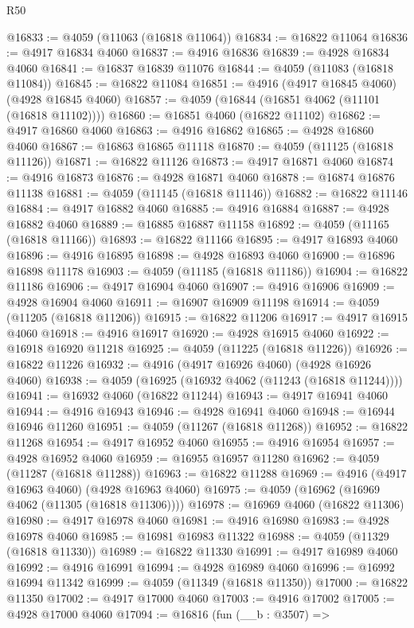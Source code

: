 \begin{lexlean}{R50}
\begin{coremodule}
@16833 := @4059 (@11063 (@16818 @11064))
@16834 := @16822 @11064
@16836 := @4917 @16834 @4060
@16837 := @4916 @16836
@16839 := @4928 @16834 @4060
@16841 := @16837 @16839 @11076
@16844 := @4059 (@11083 (@16818 @11084))
@16845 := @16822 @11084
@16851 := @4916 (@4917 @16845 @4060) (@4928 @16845 @4060)
@16857 := @4059 (@16844 (@16851 @4062 (@11101 (@16818 @11102))))
@16860 := @16851 @4060 (@16822 @11102)
@16862 := @4917 @16860 @4060
@16863 := @4916 @16862
@16865 := @4928 @16860 @4060
@16867 := @16863 @16865 @11118
@16870 := @4059 (@11125 (@16818 @11126))
@16871 := @16822 @11126
@16873 := @4917 @16871 @4060
@16874 := @4916 @16873
@16876 := @4928 @16871 @4060
@16878 := @16874 @16876 @11138
@16881 := @4059 (@11145 (@16818 @11146))
@16882 := @16822 @11146
@16884 := @4917 @16882 @4060
@16885 := @4916 @16884
@16887 := @4928 @16882 @4060
@16889 := @16885 @16887 @11158
@16892 := @4059 (@11165 (@16818 @11166))
@16893 := @16822 @11166
@16895 := @4917 @16893 @4060
@16896 := @4916 @16895
@16898 := @4928 @16893 @4060
@16900 := @16896 @16898 @11178
@16903 := @4059 (@11185 (@16818 @11186))
@16904 := @16822 @11186
@16906 := @4917 @16904 @4060
@16907 := @4916 @16906
@16909 := @4928 @16904 @4060
@16911 := @16907 @16909 @11198
@16914 := @4059 (@11205 (@16818 @11206))
@16915 := @16822 @11206
@16917 := @4917 @16915 @4060
@16918 := @4916 @16917
@16920 := @4928 @16915 @4060
@16922 := @16918 @16920 @11218
@16925 := @4059 (@11225 (@16818 @11226))
@16926 := @16822 @11226
@16932 := @4916 (@4917 @16926 @4060) (@4928 @16926 @4060)
@16938 := @4059 (@16925 (@16932 @4062 (@11243 (@16818 @11244))))
@16941 := @16932 @4060 (@16822 @11244)
@16943 := @4917 @16941 @4060
@16944 := @4916 @16943
@16946 := @4928 @16941 @4060
@16948 := @16944 @16946 @11260
@16951 := @4059 (@11267 (@16818 @11268))
@16952 := @16822 @11268
@16954 := @4917 @16952 @4060
@16955 := @4916 @16954
@16957 := @4928 @16952 @4060
@16959 := @16955 @16957 @11280
@16962 := @4059 (@11287 (@16818 @11288))
@16963 := @16822 @11288
@16969 := @4916 (@4917 @16963 @4060) (@4928 @16963 @4060)
@16975 := @4059 (@16962 (@16969 @4062 (@11305 (@16818 @11306))))
@16978 := @16969 @4060 (@16822 @11306)
@16980 := @4917 @16978 @4060
@16981 := @4916 @16980
@16983 := @4928 @16978 @4060
@16985 := @16981 @16983 @11322
@16988 := @4059 (@11329 (@16818 @11330))
@16989 := @16822 @11330
@16991 := @4917 @16989 @4060
@16992 := @4916 @16991
@16994 := @4928 @16989 @4060
@16996 := @16992 @16994 @11342
@16999 := @4059 (@11349 (@16818 @11350))
@17000 := @16822 @11350
@17002 := @4917 @17000 @4060
@17003 := @4916 @17002
@17005 := @4928 @17000 @4060
@17094 := @16816
    (fun (__b : @3507) =>

\end{coremodule}
\end{lexlean}
